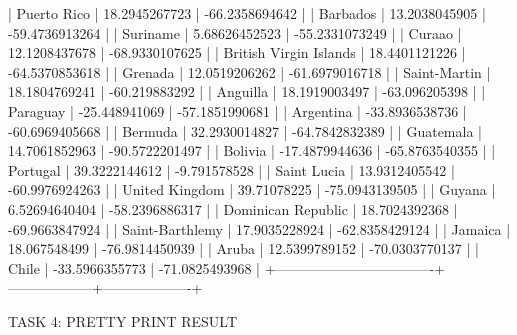 |           Puerto Rico            |  18.2945267723   |   -66.2358694642  |
|             Barbados             |  13.2038045905   |   -59.4736913264  |
|             Suriname             |  5.68626452523   |   -55.2331073249  |
|              Curaao              |  12.1208437678   |   -68.9330107625  |
|      British Virgin Islands      |  18.4401121226   |   -64.5370853618  |
|             Grenada              |  12.0519206262   |   -61.6979016718  |
|           Saint-Martin           |  18.1804769241   |   -60.219883292   |
|             Anguilla             |  18.1919003497   |   -63.096205398   |
|             Paraguay             |  -25.448941069   |   -57.1851990681  |
|            Argentina             |  -33.8936538736  |   -60.6969405668  |
|             Bermuda              |  32.2930014827   |   -64.7842832389  |
|            Guatemala             |  14.7061852963   |   -90.5722201497  |
|             Bolivia              |  -17.4879944636  |   -65.8763540355  |
|             Portugal             |  39.3222144612   |    -9.791578528   |
|           Saint Lucia            |  13.9312405542   |   -60.9976924263  |
|          United Kingdom          |   39.71078225    |   -75.0943139505  |
|              Guyana              |  6.52694640404   |   -58.2396886317  |
|        Dominican Republic        |  18.7024392368   |   -69.9663847924  |
|         Saint-Barthlemy          |  17.9035228924   |   -62.8358429124  |
|             Jamaica              |   18.067548499   |   -76.9814450939  |
|              Aruba               |  12.5399789152   |   -70.0303770137  |
|              Chile               |  -33.5966355773  |   -71.0825493968  |
+----------------------------------+------------------+-------------------+


TASK 4: PRETTY PRINT RESULT


